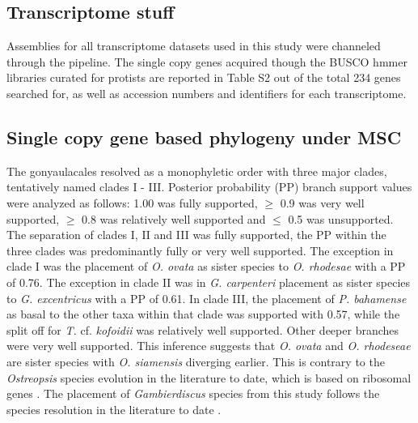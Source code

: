 \documentclass[12pt]{article}
\begin{document}
\subsection*{Transcriptome stuff}
Assemblies for all transcriptome datasets used in this study were channeled through the pipeline. 
The single copy genes acquired though the BUSCO hmmer libraries curated for protists are reported in Table S2 out of the total 234 genes searched for, as well as accession numbers and identifiers for each transcriptome.
\subsection*{Single copy gene based phylogeny under MSC}
The gonyaulacales resolved as a monophyletic order with three major clades, tentatively named clades I - III. 
Posterior probability (PP) branch support values were analyzed as follows: 1.00 was fully supported, $\geq$ 0.9 was very well supported, $\geq$ 0.8 was relatively well supported and $\leq$ 0.5 was unsupported.
The separation of clades I, II and III was fully supported, the PP within the three clades was predominantly fully or very well supported. 
The exception in clade I was the placement of \emph{O. ovata} as sister species to \emph{O. rhodesae} with a PP of 0.76. 
The exception in clade II was in \emph{G. carpenteri} placement as sister species to \emph{G. excentricus} with a PP of 0.61. In clade III, the placement of \emph{P. bahamense} as basal to the other taxa within that clade was supported with 0.57, while the split off for \emph{T.} cf. \emph{kofoidii} was relatively well supported.
Other deeper branches were very well supported.
This inference suggests that \emph{O. ovata} and \emph{O. rhodeseae} are sister species with \emph{O. siamensis} diverging earlier. 
This is contrary to the \emph{Ostreopsis} species evolution in the literature to date, which is based on ribosomal genes \cite{verma2016molecular}. 
The placement of \emph{Gambierdiscus} species from this study follows the species resolution in the literature to date \cite{kretzschmar2017characterization}. 
\end{document}

